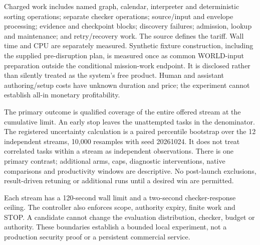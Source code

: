 Charged work includes named graph, calendar, interpreter and deterministic sorting operations; separate checker operations; source/input and envelope processing; evidence and checkpoint blocks; discovery failures; admission, lookup and maintenance; and retry/recovery work. The source defines the tariff. Wall time and CPU are separately measured. Synthetic fixture construction, including the supplied pre-disruption plan, is measured once as common WORLD-input preparation outside the conditional mission-work endpoint. It is disclosed rather than silently treated as the system's free product. Human and assistant authoring/setup costs have unknown duration and price; the experiment cannot establish all-in monetary profitability.

The primary outcome is qualified coverage of the entire offered stream at the cumulative limit. An early stop leaves the unattempted tasks in the denominator. The registered uncertainty calculation is a paired percentile bootstrap over the 12 independent streams, 10,000 resamples with seed 20261024. It does not treat correlated tasks within a stream as independent observations. There is one primary contrast; additional arms, caps, diagnostic interventions, native comparisons and productivity windows are descriptive. No post-launch exclusions, result-driven retuning or additional runs until a desired win are permitted.

Each stream has a 120-second wall limit and a two-second checker-response ceiling. The controller also enforces scope, authority expiry, finite work and STOP. A candidate cannot change the evaluation distribution, checker, budget or authority. These boundaries establish a bounded local experiment, not a production security proof or a persistent commercial service.

